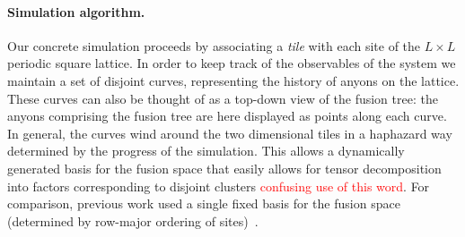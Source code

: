 \documentclass[aps, prl, letterpaper, twocolumn, superscriptaddress, notitlepage, 10pt]{revtex4-1}
\newcommand{\dude}[1]{\textcolor{red}{#1}}
\newcommand{\stf}[1]{\textcolor{green}{#1}}
\begin{document}
\paragraph{Simulation algorithm.}


Our concrete simulation proceeds by associating a \emph{tile} with each site of the 
$L\times L$ periodic square lattice.
In order to keep track of the observables of the system 
we maintain a set of disjoint curves, representing the history of anyons on the lattice.
These curves can also be thought of as a top-down view of the fusion tree:
the anyons comprising the fusion tree are here displayed as points along each curve. 
In general, the curves wind around the two 
dimensional tiles in a haphazard way determined by the progress of the simulation.
This allows a dynamically generated basis for the fusion space that easily allows for tensor 
decomposition into factors corresponding 
to disjoint clusters \dude{confusing use of this word}.
For comparison, previous work 
used a single fixed basis for the fusion space (determined by row-major ordering of 
sites)~\cite{Brell2013}.
\end{document}

